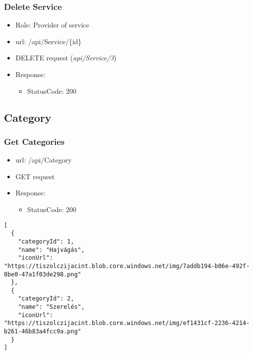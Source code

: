 \documentclass[11pt]{article}
\begin{document}
\subsubsection{Delete Service}
\label{sec:orgdbad682}
\begin{itemize}
\item Role: Provider of service
\item url: /api/Service/\{id\}
\item DELETE request (\emph{api/Service/3})
\item Response:
\begin{itemize}
\item StatusCode: 200
\end{itemize}
\end{itemize}
\subsection{Category}
\label{sec:orge774a1a}
\subsubsection{Get Categories}
\label{sec:org4c99edb}
\begin{itemize}
\item url: /api/Category
\item GET request
\item Response:
\begin{itemize}
\item StatusCode: 200
\end{itemize}
\end{itemize}
\begin{verbatim}
[
  {
    "categoryId": 1,
    "name": "Hajvágás",
    "iconUrl": "https://tiszolczijacint.blob.core.windows.net/img/7addb194-b06e-492f-8be0-47a1f03de298.png"
  },
  {
    "categoryId": 2,
    "name": "Szerelés",
    "iconUrl": "https://tiszolczijacint.blob.core.windows.net/img/ef1431cf-2236-4214-b261-46b83a4fcc9a.png"
  }
]
\end{verbatim}
\end{document}
